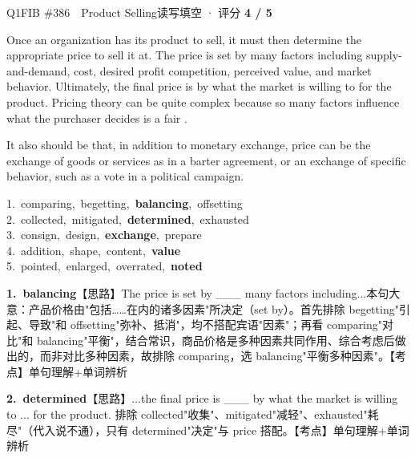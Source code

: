 \begin{qblock}{Q1\quad FIB \#386\ \ Product Selling}{读写填空 · 评分 \textcolor{cAccent}{\bfseries 4 / 5}}
\begin{promptbox}
Once an organization has its product to sell, it must then determine the appropriate price to sell it at. The price is set by  many factors including supply-and-demand, cost, desired profit competition, perceived value, and market behavior. Ultimately, the final price is  by what the market is willing to  for the product. Pricing theory can be quite complex because so many factors influence what the purchaser decides is a fair .

It also should be  that, in addition to monetary exchange, price can be the exchange of goods or services as in a barter agreement, or an exchange of specific behavior, such as a vote in a political campaign.
\end{promptbox}
{\small
1.\ comparing,\ begetting,\ \textbf{balancing},\ offsetting\\
2.\ collected,\ mitigated,\ \textbf{determined},\ exhausted\\
3.\ consign,\ design,\ \textbf{exchange},\ prepare\\
4.\ addition,\ shape,\ content,\ \textbf{value}\\
5.\ pointed,\ enlarged,\ overrated,\ \textbf{noted}}
\begin{notebox}\footnotesize
\textbf{1.\ balancing}\quad【思路】The price is set by \_\_\_ many factors including...本句大意：产品价格由"包括……在内的诸多因素"所决定（set by）。首先排除 begetting"引起、导致"和 offsetting"弥补、抵消"，均不搭配宾语"因素"；再看 comparing"对比"和 balancing"平衡"，结合常识，商品价格是多种因素共同作用、综合考虑后做出的，而非对比多种因素，故排除 comparing，选 balancing"平衡多种因素"。【考点】单句理解+单词辨析\par\smallskip
\textbf{2.\ determined}\quad【思路】...the final price is \_\_\_ by what the market is willing to ... for the product. 排除 collected"收集"、mitigated"减轻"、exhausted"耗尽"（代入说不通），只有 determined"决定"与 price 搭配。【考点】单句理解+单词辨析\par\smallskip

\end{notebox}
\end{qblock}
